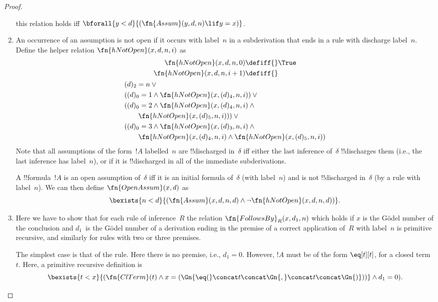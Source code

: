 \documentclass[../../../include/open-logic-section]{subfiles}
\begin{document}
\begin{proof}
\begin{enumerate}
  this relation holds iff $\bforall{y<d}{(\fn{Assum}(y, d, n) \lif y =
  x)}$.
\item An occurrence of an assumption is not open if it occurs
  with label~$n$ in a subderivation that ends in a rule with discharge
  label~$n$. Define the helper relation $\fn{hNotOpen}(x, d, n, i)$
  as
  \begin{multline*}
    \begin{aligned}
    \fn{hNotOpen}(x, d, n, 0) \defiff {} & \True\\   
    \fn{hNotOpen}(x, d, n, i+1) \defiff {} 
    \end{aligned}\\
    \begin{aligned}
      & (d)_2 = n \lor {}\\
      & ((d)_0 = 1 \land \fn{hNotOpen}(x, (d)_4, n, i)) \lor {}\\
      & ((d)_0 = 2 \land \fn{hNotOpen}(x, (d)_4, n, i) \land {}\\
      & \qquad\fn{hNotOpen}(x, (d)_5, n, i))) \lor {}\\
      & ((d)_0 = 3 \land \fn{hNotOpen}(x, (d)_3, n, i) \land {}\\
      & \qquad \fn{hNotOpen}(x, (d)_4, n, i) \land
      \fn{hNotOpen}(x, (d)_5, n, i))\\
    \end{aligned}
  \end{multline*}
  Note that all assumptions of the form~$!A$ labelled~$n$ are
  !!{discharged} in~$\delta$ iff either the last inference of~$\delta$
  !!{discharge}s them (i.e., the last inference has label~$n$), or if
  it is !!{discharged} in all of the immediate subderivations.

  A !!{formula}~$!A$ is an open assumption of~$\delta$ iff it is an
  initial formula of~$\delta$ (with label~$n$) and is not
  !!{discharged} in~$\delta$ (by a rule with label~$n$). We can then
  define $\fn{OpenAssum}(x, d)$ as
  \[
  \bexists{n<d}{(\fn{Assum}(x,d,n,d)
  \land \lnot\fn{hNotOpen}(x, d, n, d))}.
  \]
\item Here we have to show that for each rule of inference~$R$ the
  relation $\fn{FollowsBy}_R(x, d_1, n)$ which holds if $x$ is the
  G\"odel number of the conclusion and $d_1$~is the G\"odel number of a
  derivation ending in the premise of a correct application of~$R$
  with label~$n$ is primitive recursive, and similarly for rules with
  two or three premises.

  The simplest case is that of the \Intro{\eq} rule. Here there is no
  premise, i.e., $d_1 = 0$.  However, $!A$ must be of the form
  $\eq[t][t]$, for a closed term~$t$. Here, a primitive recursive
  definition is
  \[
  \bexists{t<x}{(\fn{ClTerm}(t) \land x = 
    (\Gn{{\eq}(} \concat t \concat \Gn{,} \concat t \concat \Gn{)}))}
  \land d_1 = 0).
  \]


\end{enumerate}
\end{proof}
\end{document}
